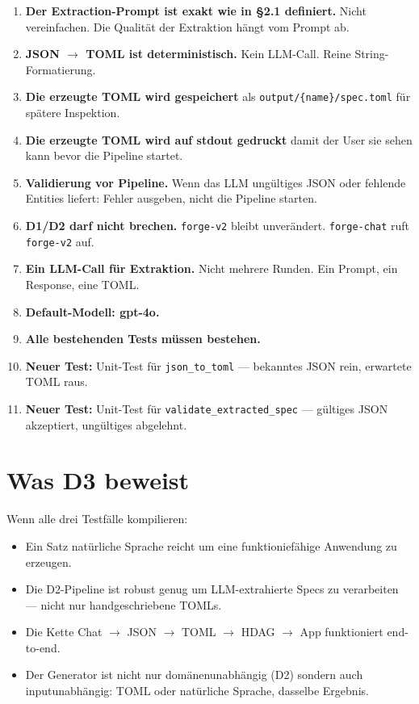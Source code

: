 \documentclass[11pt,a4paper]{article}
\begin{document}
\begin{enumerate}
\item \textbf{Der Extraction-Prompt ist exakt wie in \S2.1 definiert.}
      Nicht vereinfachen. Die Qualit\"at der Extraktion h\"angt vom
      Prompt ab.
\item \textbf{JSON $\to$ TOML ist deterministisch.} Kein LLM-Call.
      Reine String-Formatierung.
\item \textbf{Die erzeugte TOML wird gespeichert} als
      \texttt{output/\{name\}/spec.toml} f\"ur sp\"atere Inspektion.
\item \textbf{Die erzeugte TOML wird auf stdout gedruckt} damit
      der User sie sehen kann bevor die Pipeline startet.
\item \textbf{Validierung vor Pipeline.} Wenn das LLM ung\"ultiges
      JSON oder fehlende Entities liefert: Fehler ausgeben, nicht
      die Pipeline starten.
\item \textbf{D1/D2 darf nicht brechen.} \texttt{forge-v2} bleibt
      unver\"andert. \texttt{forge-chat} ruft \texttt{forge-v2} auf.
\item \textbf{Ein LLM-Call f\"ur Extraktion.} Nicht mehrere Runden.
      Ein Prompt, ein Response, eine TOML.
\item \textbf{Default-Modell: gpt-4o.}
\item \textbf{Alle bestehenden Tests m\"ussen bestehen.}
\item \textbf{Neuer Test:} Unit-Test f\"ur \texttt{json\_to\_toml} ---
      bekanntes JSON rein, erwartete TOML raus.
\item \textbf{Neuer Test:} Unit-Test f\"ur \texttt{validate\_extracted\_spec}
      --- g\"ultiges JSON akzeptiert, ung\"ultiges abgelehnt.
\end{enumerate}

\section{Was D3 beweist}

Wenn alle drei Testf\"alle kompilieren:

\begin{itemize}[nosep]
\item Ein Satz nat\"urliche Sprache reicht um eine funktionief\"ahige
      Anwendung zu erzeugen.
\item Die D2-Pipeline ist robust genug um LLM-extrahierte Specs
      zu verarbeiten --- nicht nur handgeschriebene TOMLs.
\item Die Kette Chat $\to$ JSON $\to$ TOML $\to$ HDAG $\to$ App
      funktioniert end-to-end.
\item Der Generator ist nicht nur dom\"anenunabh\"angig (D2) sondern
      auch inputunabh\"angig: TOML oder nat\"urliche Sprache,
      dasselbe Ergebnis.
\end{itemize}
\end{document}
